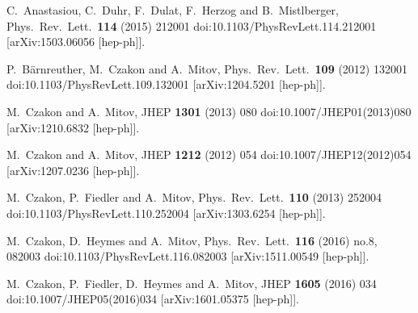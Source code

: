 \documentclass{PoS}
\begin{document}
\begin{thebibliography}{99}

  C.~Anastasiou, C.~Duhr, F.~Dulat, F.~Herzog and B.~Mistlberger,
  Phys.\ Rev.\ Lett.\  {\bf 114} (2015) 212001
  doi:10.1103/PhysRevLett.114.212001
  [arXiv:1503.06056 [hep-ph]].

  P.~B\"arnreuther, M.~Czakon and A.~Mitov,
  Phys.\ Rev.\ Lett.\  {\bf 109} (2012) 132001
  doi:10.1103/PhysRevLett.109.132001
  [arXiv:1204.5201 [hep-ph]].

  M.~Czakon and A.~Mitov,
  JHEP {\bf 1301} (2013) 080
  doi:10.1007/JHEP01(2013)080
  [arXiv:1210.6832 [hep-ph]].

  M.~Czakon and A.~Mitov,
  JHEP {\bf 1212} (2012) 054
  doi:10.1007/JHEP12(2012)054
  [arXiv:1207.0236 [hep-ph]].

  M.~Czakon, P.~Fiedler and A.~Mitov,
  Phys.\ Rev.\ Lett.\  {\bf 110} (2013) 252004
  doi:10.1103/PhysRevLett.110.252004
  [arXiv:1303.6254 [hep-ph]].

  M.~Czakon, D.~Heymes and A.~Mitov,
  Phys.\ Rev.\ Lett.\  {\bf 116} (2016) no.8,  082003
  doi:10.1103/PhysRevLett.116.082003
  [arXiv:1511.00549 [hep-ph]].

  M.~Czakon, P.~Fiedler, D.~Heymes and A.~Mitov,
  JHEP {\bf 1605} (2016) 034
  doi:10.1007/JHEP05(2016)034
  [arXiv:1601.05375 [hep-ph]].


\end{thebibliography}
\end{document}
